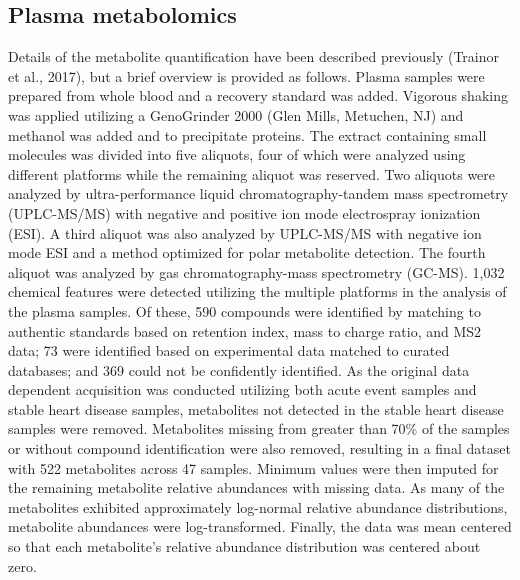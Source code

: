 \begin{DoubleSpace*}
\section{Plasma metabolomics}
Details of the metabolite quantification have been described previously (Trainor et al., 2017), but a brief overview is provided as follows. Plasma samples were prepared from whole blood and a recovery standard was added. Vigorous shaking was applied utilizing a GenoGrinder 2000 (Glen Mills, Metuchen, NJ) and methanol was added and to precipitate proteins. The extract containing small molecules was divided into five aliquots, four of which were analyzed using different platforms while the remaining aliquot was reserved. Two aliquots were analyzed by ultra-performance liquid chromatography-tandem mass spectrometry (UPLC-MS/MS) with negative and positive ion mode electrospray ionization (ESI). A third aliquot was also analyzed by UPLC-MS/MS with negative ion mode ESI and a method optimized for polar metabolite detection. The fourth aliquot was analyzed by gas chromatography-mass spectrometry (GC-MS). 1,032 chemical features  were detected utilizing the multiple platforms in the analysis of the plasma samples. Of these, 590 compounds were identified by matching to authentic standards based on retention index, mass to charge ratio, and MS2 data; 73 were identified based on experimental data matched to curated databases; and 369 could not be confidently identified. As the original data dependent acquisition was conducted utilizing both acute event samples and stable heart disease samples, metabolites not detected in the stable heart disease samples were removed. Metabolites missing from greater than 70\% of the samples or without compound identification were also removed, resulting in a final dataset with 522 metabolites across 47 samples. Minimum values were then imputed for the remaining metabolite relative abundances with missing data. As many of the metabolites exhibited approximately log-normal relative abundance distributions, metabolite abundances were log-transformed. Finally, the data was mean centered so that each metabolite’s relative abundance distribution was centered about zero. 


\end{DoubleSpace*}
